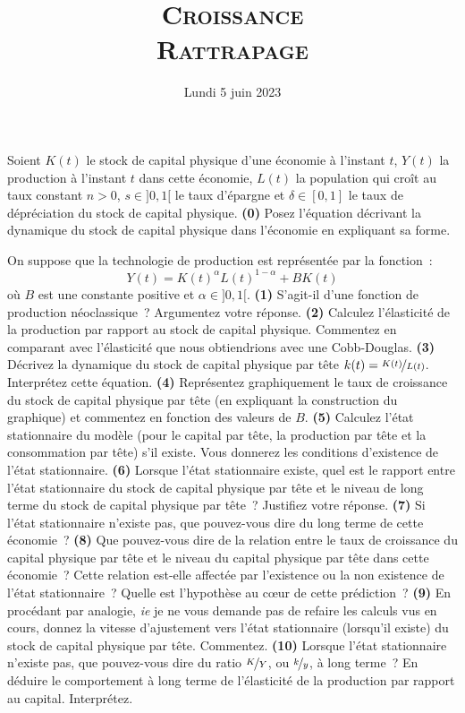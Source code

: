 \documentclass[10pt,a4paper,notitlepage]{article}
\newcommand{\question}[1]{\textbf{(#1)}}
\begin{document}
\title{\textsc{Croissance\\ \small{Rattrapage}}}
\date{Lundi 5 juin 2023}

\maketitle

Soient $K(t)$ le stock de capital physique d'une économie à l'instant
$t$, $Y(t)$ la production à l'instant $t$ dans cette économie, $L(t)$ la population qui
croît au taux constant $n>0$, $s\in]0,1[$ le taux d'épargne et
$\delta\in[0,1]$ le taux de dépréciation du stock de capital
physique. \question{0} Posez l'équation décrivant la dynamique du
stock de capital physique dans l'économie en expliquant sa
forme.\newline

On suppose que la technologie de production est représentée par la fonction~:
\[
Y(t) = K(t)^\alpha L(t)^{1-\alpha} + BK(t)
\]
où $B$ est une constante positive et $\alpha\in]0,1[$. \question{1} S'agit-il
d'une fonction de production néoclassique~? Argumentez votre réponse.
\question{2} Calculez l'élasticité de la production par rapport au stock de
capital physique. Commentez en comparant avec l'élasticité que nous obtiendrions
avec une Cobb-Douglas. \question{3} Décrivez la dynamique du stock de capital
physique par tête $k(t)=\nicefrac{K(t)}{L(t)}$. Interprétez cette équation.
\question{4} Représentez graphiquement le taux de croissance du stock de capital
physique par tête (en expliquant la construction du graphique) et commentez en
fonction des valeurs de $B$. \question{5} Calculez l'état stationnaire du modèle
(pour le capital par tête, la production par tête et la consommation par tête)
s'il existe. Vous donnerez les conditions d'existence de l'état stationnaire.
\question{6} Lorsque l'état stationnaire existe, quel est le rapport entre
l'état stationnaire du stock de capital physique par tête et le niveau de long
terme du stock de capital physique par tête~? Justifiez votre réponse.
\question{7} Si l'état stationnaire n'existe pas, que pouvez-vous dire du long
terme de cette économie~? \question{8} Que pouvez-vous dire de la relation entre
le taux de croissance du capital physique par tête et le niveau du capital
physique par tête dans cette économie~? Cette relation est-elle affectée par
l'existence ou la non existence de l'état stationnaire~? Quelle est l'hypothèse
au c\oe ur de cette prédiction~? \question{9} En procédant par analogie,
\emph{ie} je ne vous demande pas de refaire les calculs vus en cours, donnez la
vitesse d'ajustement vers l'état stationnaire (lorsqu'il existe) du stock de
capital physique par tête. Commentez. \question{10} Lorsque l'état stationnaire
n'existe pas, que pouvez-vous dire du ratio $\nicefrac{K}{Y}$, ou
$\nicefrac{k}{y}$, à long terme~? En déduire le comportement à long terme de
l'élasticité de la production par rapport au capital. Interprétez.
\end{document}
